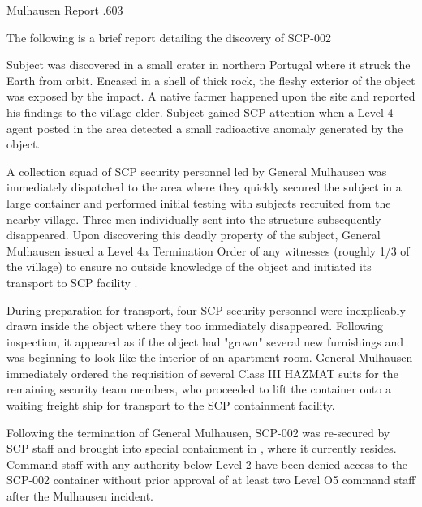 \begin{boxedminipage}{\textwidth}
\begin{flushleft}
Mulhausen Report .603\rb \linebreak
\end{flushleft}

The following is a brief report detailing the discovery of SCP-002

Subject was discovered in a small crater in northern Portugal where it struck the Earth from orbit. Encased in a shell of thick rock, the fleshy exterior of the object was exposed by the impact. A native farmer happened upon the site and reported his findings to the village elder. Subject gained SCP attention when a Level 4 agent posted in the area detected a small radioactive anomaly generated by the object.

A collection squad of SCP security personnel led by General Mulhausen was immediately dispatched to the area where they quickly secured the subject in a large container and performed initial testing with subjects recruited from the nearby village. Three men individually sent into the structure subsequently disappeared. Upon discovering this deadly property of the subject, General Mulhausen issued a Level 4a Termination Order of any witnesses (roughly 1/3 of the village) to ensure no outside knowledge of the object and initiated its transport to SCP facility \expunged.

During preparation for transport, four SCP security personnel were inexplicably drawn inside the object where they too immediately disappeared. Following inspection, it appeared as if the object had "grown" several new furnishings and was beginning to look like the interior of an apartment room. General Mulhausen immediately ordered the requisition of several Class III HAZMAT suits for the remaining security team members, who proceeded to lift the container onto a waiting freight ship for transport to the SCP containment facility.

\expunged

\expunged

Following the termination of General Mulhausen, SCP-002 was re-secured by SCP staff and brought into special containment in \classified, where it currently resides. Command staff with any authority below Level 2 have been denied access to the SCP-002 container without prior approval of at least two Level O5 command staff after the Mulhausen incident.

\end{boxedminipage}
